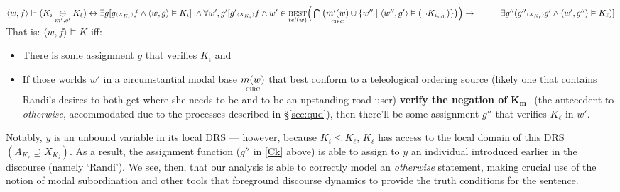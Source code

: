 \label{Ck}\\
%
$\langle w,f\rangle \Vdash(K_i\underset{m',o'}{\ominus} K_\ell)\leftrightarrow\exists g[g{\scriptscriptstyle\langle X_{K_i}\rangle}f\wedge\langle w,g\rangle\vDash K_i] 
\;\wedge\\
\forall w',g'[g'{\scriptscriptstyle\langle X_{K_i}\rangle}f\wedge w'\in\underset{tel(w)}{\textsc{best}}\Big(\bigcap\big(\underset{\textsc{circ}}{m'(w)}\cup\{w''\mid\langle w'',g'\rangle\vDash(\neg K_{i_{\text{sub}}})\}\big)\Big) \to\\
	\hspace*{2.85em} \exists g''(g''{\scriptscriptstyle\langle X_{K_\ell}\rangle}g'\wedge \langle w',g''\rangle\vDash K_\ell)]$\\[1em]
That is: $ \langle w,f\rangle\vDash K $ iff:
\begin{itemize}
	\item \; There is some assignment $ g $ that verifies $ K_i $ and
	\item \; If those worlds $ w' $ in a circumstantial modal base $\underset{\textsc{circ}}{m(w)}$ that best conform to a teleological ordering source (likely one that contains Randi's desires to both get where she needs to be and to be an upstanding road user) \textbf{verify the negation of} $ \boldsymbol{ K_{m^+}} $ (the antecedent to \textit{otherwise}, accommodated due to the processes described in \S\ref{sec:qud}), then there'll be some assignment $ g'' $ that verifies $ K_\ell $ in $w'$.
\end{itemize}
%
\xe

Notably, $ y $ is an unbound variable in its local DRS --- however, because $ K_i\leqslant K_\ell $, $ K_\ell $  has access to the local domain of this DRS $ (A_{K_\ell}\supseteq X_{K_{i}}) $. As a result, the assignment function ($ g'' $ in \ref{Ck} above) is able to assign to $ y $ an individual introduced earlier in the discourse (namely `Randi').
 We see, then, that our analysis is able to correctly model an \textit{otherwise} statement, making crucial use of the notion of modal subordination and other tools that foreground discourse dynamics to provide the truth conditions for the sentence. 
 
 
 
 
 

